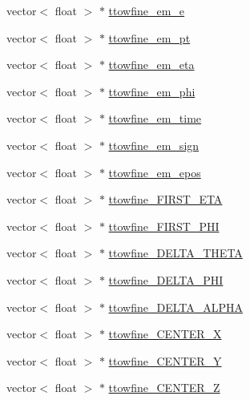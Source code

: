 \begin{DoxyCompactItemize}
\item 
vector$<$ float $>$ $\ast$ \hyperlink{classXMLWriter_a5a68560c835cae970d7518cbd57ccc12}{ttowfine\+\_\+em\+\_\+e}
\item 
vector$<$ float $>$ $\ast$ \hyperlink{classXMLWriter_a3f95870f307f504e53137bf14bb56869}{ttowfine\+\_\+em\+\_\+pt}
\item 
vector$<$ float $>$ $\ast$ \hyperlink{classXMLWriter_aa233989db9ac8da9a774ab268c71a65d}{ttowfine\+\_\+em\+\_\+eta}
\item 
vector$<$ float $>$ $\ast$ \hyperlink{classXMLWriter_a69f3e4bb22fee1a2f8f77f68f7150e2a}{ttowfine\+\_\+em\+\_\+phi}
\item 
vector$<$ float $>$ $\ast$ \hyperlink{classXMLWriter_a4ff5d59b98b45fd72e0b6aa6c76ae606}{ttowfine\+\_\+em\+\_\+time}
\item 
vector$<$ float $>$ $\ast$ \hyperlink{classXMLWriter_ae1285eb82d08233d6bb1a90b055e0cb0}{ttowfine\+\_\+em\+\_\+sign}
\item 
vector$<$ float $>$ $\ast$ \hyperlink{classXMLWriter_a70364553d2a97bf86d7b80db5c0a1b86}{ttowfine\+\_\+em\+\_\+epos}
\item 
vector$<$ float $>$ $\ast$ \hyperlink{classXMLWriter_ab75f0b5e719e7229c4a09397555dca23}{ttowfine\+\_\+\+F\+I\+R\+S\+T\+\_\+\+E\+TA}
\item 
vector$<$ float $>$ $\ast$ \hyperlink{classXMLWriter_a1e3f8379e393bac7fbbbdd725e201946}{ttowfine\+\_\+\+F\+I\+R\+S\+T\+\_\+\+P\+HI}
\item 
vector$<$ float $>$ $\ast$ \hyperlink{classXMLWriter_ae0704f128e93ed37807708ad717fb91b}{ttowfine\+\_\+\+D\+E\+L\+T\+A\+\_\+\+T\+H\+E\+TA}
\item 
vector$<$ float $>$ $\ast$ \hyperlink{classXMLWriter_a513fd24ecba951c5533bb7e23a8152e4}{ttowfine\+\_\+\+D\+E\+L\+T\+A\+\_\+\+P\+HI}
\item 
vector$<$ float $>$ $\ast$ \hyperlink{classXMLWriter_a910abdbf756019ae4092c1b7b4e2e688}{ttowfine\+\_\+\+D\+E\+L\+T\+A\+\_\+\+A\+L\+P\+HA}
\item 
vector$<$ float $>$ $\ast$ \hyperlink{classXMLWriter_aa2bc7bcd9d74945837ca0df99fe3ad55}{ttowfine\+\_\+\+C\+E\+N\+T\+E\+R\+\_\+X}
\item 
vector$<$ float $>$ $\ast$ \hyperlink{classXMLWriter_af6f7a45d4468e13222df56348f394adf}{ttowfine\+\_\+\+C\+E\+N\+T\+E\+R\+\_\+Y}
\item 
vector$<$ float $>$ $\ast$ \hyperlink{classXMLWriter_a00c4ae4696acc42218f5ac11495ebb39}{ttowfine\+\_\+\+C\+E\+N\+T\+E\+R\+\_\+Z}
\item 

\end{DoxyCompactItemize}
